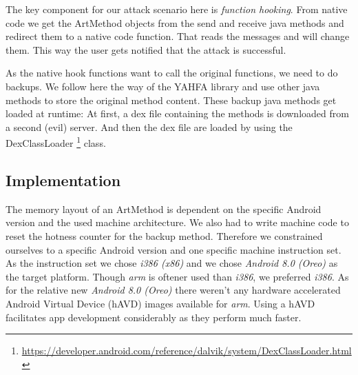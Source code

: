 The key component for our attack scenario here is \emph{function hooking}.
From native code we get the ArtMethod objects from the send and receive java methods and redirect them to a native code function. That reads the messages and will change them. This way the user gets notified that the attack is successful. 

As the native hook functions want to call the original functions, we need to do backups. We follow here the way of the YAHFA library and use other java methods to store the original method content. These backup java methods get loaded at runtime: At first, a dex file containing the methods is downloaded from a second (evil) server. And then the dex file are loaded by using the DexClassLoader \footnote{\url{https://developer.android.com/reference/dalvik/system/DexClassLoader.html}}
class.






\subsection{Implementation}

The memory layout of an ArtMethod is dependent on the specific Android version and the used machine architecture. We also had to write machine code to reset the hotness counter for the backup method. Therefore we constrained ourselves to a specific Android version and one specific machine instruction set. As the instruction set we  chose \emph{i386 (x86)} and 
we chose \emph{Android 8.0 (Oreo)} as the target platform.
Though \emph{arm} is oftener used than \emph{i386}, we preferred \emph{i386}. As for the relative new \emph{Android 8.0 (Oreo)} there weren't any hardware accelerated Android Virtual Device (hAVD) images available for \emph{arm}. Using a hAVD facilitates app development considerably as they perform much faster. 

